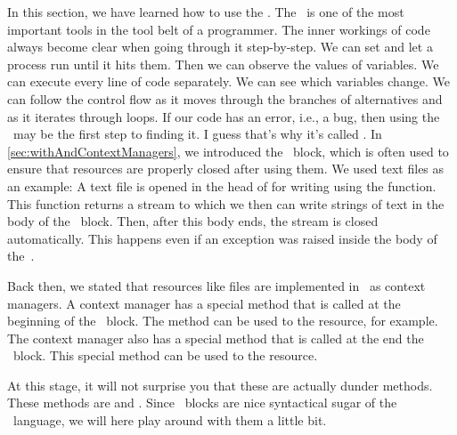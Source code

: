 In this section, we have learned how to use the \debugger.
The \debugger\ is one of the most important tools in the tool belt of a programmer.
The inner workings of code always become clear when going through it step-by-step.
We can set  and let a process run until it hits them.
Then we can observe the values of variables.
We can execute every line of code separately.
We can see which variables change.
We can follow the control flow as it moves through the branches of alternatives and as it iterates through loops.
If our code has an error, i.e., a bug, then using the \debugger\ may be the first step to finding it.
I guess that's why it's called \debugger.
%
\FloatBarrier%
\endhsection%
%
%
\label{sec:dunder:contextManager}%
%
In \cref{sec:withAndContextManagers}, we introduced the ~block, which is often used to ensure that resources are properly closed after using them.
We used text files as an example:
A text file is opened in the head of  for writing using the  function.
This function returns a stream to which we then can write strings of text in the body of the ~block.
Then, after this body ends, the stream is closed automatically.
This happens even if an exception was raised inside the body of the~.

Back then, we stated that resources like files are implemented in \python\ as context managers.
A context manager has a special method that is called at the beginning of the ~block.
The method can be used to  the resource, for example.
The context manager also has a special method that is called at the end the ~block.
This special method can be used to  the resource.

At this stage, it will not surprise you that these  are actually dunder methods.
These methods are  and .
Since ~blocks are nice syntactical sugar of the \python\ language, we will here play around with them a little bit.

